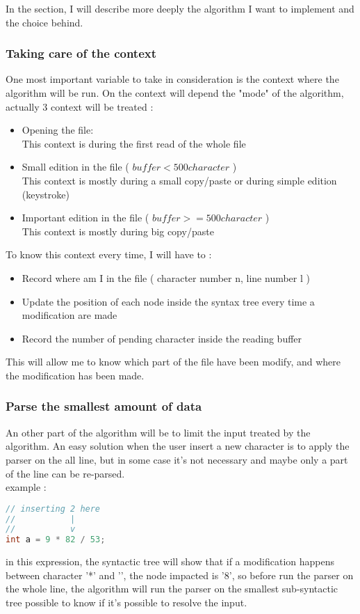 In the section, I will describe more deeply the algorithm I want to implement and the choice behind.
\subsubsection{Taking care of the context}
One most important variable to take in consideration is the context where the algorithm will be run. On the context will depend the "mode" of the algorithm, actually 3 context will be treated :
\begin{itemize}
\item Opening the file: \\
This context is during the first read of the whole file
\item Small edition in the file ( \( buffer < 500 character\) )\\
This context is mostly during a small copy/paste or during simple edition (keystroke)
\item Important edition in the file ( \( buffer >= 500 character\) )\\
This context is mostly during big copy/paste
\end{itemize}

To know this context every time, I will have to :

\begin{itemize}
\item Record where am I in the file ( character number n, line number l )
\item Update the position of each node inside the syntax tree every time a modification are made
\item Record the number of pending character inside the reading buffer
\end{itemize}
This will allow me to know which part of the file have been modify, and where the modification has been made.\\

\subsubsection{Parse the smallest amount of data}
An other part of the algorithm will be to limit the input treated by the algorithm. An easy solution when the user insert a new character is to apply the parser on the all line, but in some case it's not necessary and maybe only a part of the line can be re-parsed.\\
example :
\begin{lstlisting}[language=C++, caption=parsing optimisation in C]
// inserting 2 here
//           |
//           v
int a = 9 * 82 / 53;
\end{lstlisting}
in this expression, the syntactic tree will show that if a modification happens between character '*' and '\/', the node impacted is '8', so before run the parser on the whole line, the algorithm will run the parser on the smallest sub-syntactic tree possible to know if it's possible to resolve the input.

